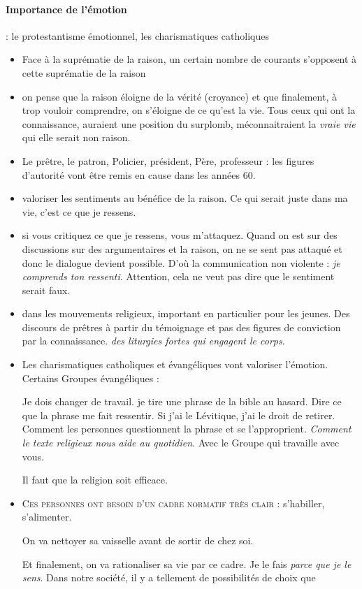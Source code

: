       \paragraph{Importance de l’émotion} : le protestantisme émotionnel, les charismatiques catholiques
    \begin{itemize}
        \item Face à la suprématie de la raison, un certain nombre de courants s'opposent à cette suprématie de la raison 
        \item on pense que la raison éloigne de la vérité (croyance) et que finalement, à trop vouloir comprendre, on s'éloigne de ce qu'est la vie.  Tous ceux qui ont la connaissance, auraient une position du surplomb, méconnaitraient la \textit{vraie vie} qui elle serait non raison.
        \item Le prêtre, le patron, Policier, président, Père, professeur : les figures d'autorité vont être remis en cause dans les années 60. 
        \item valoriser les sentiments au bénéfice de la raison. Ce qui serait juste dans ma vie, c'est ce que je ressens.  
        \item si vous critiquez ce que je ressens, vous m'attaquez. Quand on est sur des discussions sur des argumentaires et la raison, on ne se sent pas attaqué et donc le dialogue devient possible.  D'où la communication non violente : \textit{je comprends ton ressenti}. Attention, cela ne veut pas dire que le sentiment serait faux. 
        \item dans les mouvements religieux, important en particulier pour les jeunes.  Des discours de prêtres à partir du témoignage et pas des figures de conviction par la connaissance. \textit{des liturgies fortes qui engagent le corps}. 
        \item Les charismatiques catholiques et évangéliques vont valoriser l'émotion. Certains Groupes évangéliques : 
        \begin{Ex}
            Je dois changer de travail. je tire une phrase de la bible au hasard.
            Dire ce que la phrase me fait ressentir. 
            Si j'ai le Lévitique, j'ai le droit de retirer. Comment les personnes questionnent la phrase et se l'approprient. \textit{Comment le texte religieux nous aide au quotidien}. Avec le Groupe qui travaille avec vous.
        \end{Ex}
         Il faut que la religion soit efficace. 
         \item \textsc{Ces personnes ont besoin d'un cadre normatif très clair} : s'habiller, s'alimenter. 
         \begin{Ex}[Pentecotisme]
             On va nettoyer sa vaisselle avant de sortir de chez soi. 
         \end{Ex}
         Et finalement, on va rationaliser sa vie par ce cadre. Je le fais \textit{parce que je le sens}. Dans notre société, il y a tellement de possibilités de choix que 
    \end{itemize}
